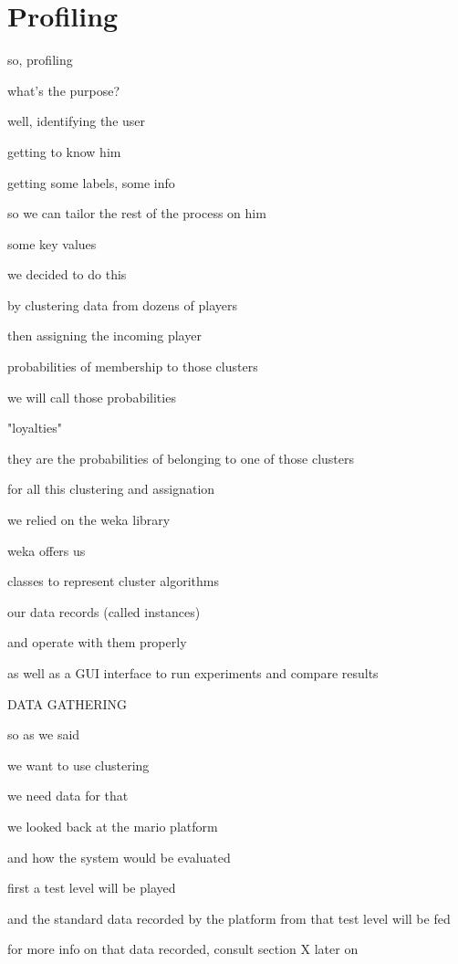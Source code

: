\chapter{Profiling}

so, profiling

what's the purpose?

well, identifying the user

getting to know him

getting some labels, some info

so we can tailor the rest of the process on him

some key values

we decided to do this

by clustering data from dozens of players

then assigning the incoming player

probabilities of membership to those clusters

we will call those probabilities

"loyalties"

they are the probabilities of belonging to one of those clusters

for all this clustering and assignation

we relied on the weka library

weka offers us

classes to represent cluster algorithms

our data records (called instances) 

and operate with them properly

as well as a GUI interface to run experiments and compare results

DATA GATHERING

so as we said

we want to use clustering

we need data for that

we looked back at the mario platform

and how the system would be evaluated

first a test level will be played

and the standard data recorded by the platform from that test level will be fed

for more info on that data recorded, consult section X later on

